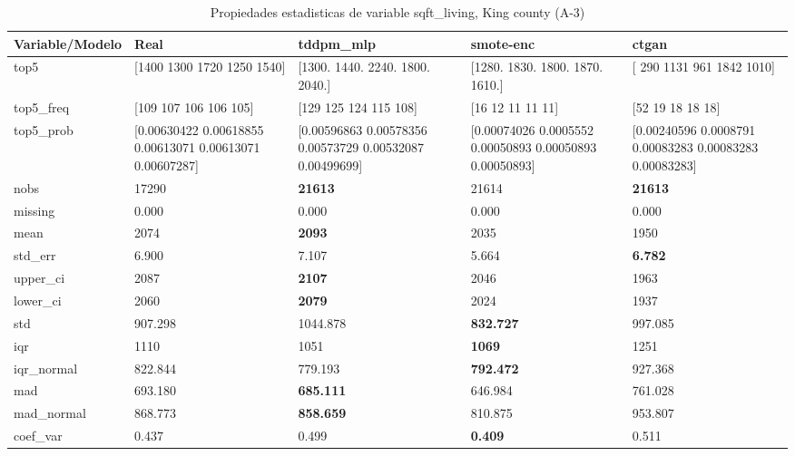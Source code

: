 \begin{table}[H]
\centering
\fontsize{8}{14}\selectfont
\caption{Propiedades  estadisticas de variable sqft\_living, King county (A-3)}
\label{table-stats-king county-a-3-sqft_living}
\begin{tabular}{|l|m{10em}|m{10em}|m{10em}|m{10em}|}
\hline
 \rowcolor[gray]{0.8}
Variable/Modelo & Real & tddpm\_mlp & smote-enc & ctgan \\
\hline top5 & [1400 1300 1720 1250 1540] & [1300. 1440. 2240. 1800. 2040.] & [1280. 1830. 1800. 1870. 1610.] & [ 290 1131  961 1842 1010] \\
\hline top5\_freq & [109 107 106 106 105] & [129 125 124 115 108] & [16 12 11 11 11] & [52 19 18 18 18] \\
\hline top5\_prob & [0.00630422 0.00618855 0.00613071 0.00613071 0.00607287] & [0.00596863 0.00578356 0.00573729 0.00532087 0.00499699] & [0.00074026 0.0005552  0.00050893 0.00050893 0.00050893] & [0.00240596 0.0008791  0.00083283 0.00083283 0.00083283] \\
\hline nobs & 17290 & \bfseries 21613 & \cellcolor[rgb]{0.9, 0.54, 0.52} 21614 & \bfseries 21613 \\
\hline missing & 0.000 & 0.000 & 0.000 & 0.000 \\
\hline mean & 2074 & \bfseries 2093 & 2035 & \cellcolor[rgb]{0.9, 0.54, 0.52} 1950 \\
\hline std\_err & 6.900 & 7.107 & \cellcolor[rgb]{0.9, 0.54, 0.52} 5.664 & \bfseries 6.782 \\
\hline upper\_ci & 2087 & \bfseries 2107 & 2046 & \cellcolor[rgb]{0.9, 0.54, 0.52} 1963 \\
\hline lower\_ci & 2060 & \bfseries 2079 & 2024 & \cellcolor[rgb]{0.9, 0.54, 0.52} 1937 \\
\hline std & 907.298 & \cellcolor[rgb]{0.9, 0.54, 0.52} 1044.878 & \bfseries 832.727 & 997.085 \\
\hline iqr & 1110 & 1051 & \bfseries 1069 & \cellcolor[rgb]{0.9, 0.54, 0.52} 1251 \\
\hline iqr\_normal & 822.844 & 779.193 & \bfseries 792.472 & \cellcolor[rgb]{0.9, 0.54, 0.52} 927.368 \\
\hline mad & 693.180 & \bfseries 685.111 & 646.984 & \cellcolor[rgb]{0.9, 0.54, 0.52} 761.028 \\
\hline mad\_normal & 868.773 & \bfseries 858.659 & 810.875 & \cellcolor[rgb]{0.9, 0.54, 0.52} 953.807 \\
\hline coef\_var & 0.437 & 0.499 & \bfseries 0.409 & \cellcolor[rgb]{0.9, 0.54, 0.52} 0.511 \\

\end{tabular}
\end{table}
